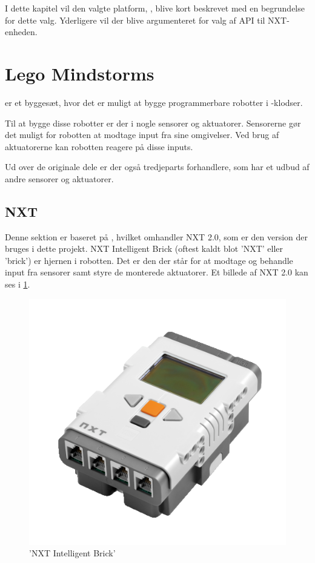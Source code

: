 I dette kapitel vil den valgte platform, \legoms, blive kort beskrevet med en begrundelse for dette valg.
Yderligere vil der blive argumenteret for valg af API til NXT-enheden.

\section{Lego Mindstorms}\label{lego:mindstorms-nxt}
\legoms er et byggesæt, hvor det er muligt at bygge programmerbare robotter i \lego-klodser.

Til at bygge disse robotter er der i \legoms nogle sensorer og aktuatorer. Sensorerne gør det muligt for robotten at modtage input fra sine omgivelser.
Ved brug af aktuatorerne kan robotten reagere på disse inputs.

Ud over de originale \lego dele er der også tredjeparts forhandlere, som har et udbud af andre sensorer og aktuatorer. 

\subsection{NXT}
Denne sektion er baseret på \cite{nxt}, hvilket omhandler NXT 2.0, som er den version der bruges i dette projekt.
NXT Intelligent Brick (oftest kaldt blot 'NXT' eller 'brick') er hjernen i \legoms robotten.
Det er den der står for at modtage og behandle input fra sensorer samt styre de monterede aktuatorer.
Et billede af NXT 2.0 kan ses i \cref{platform:nxt}.

\begin{figure}
\begin{center}
\includegraphics[scale=.5]{./graphics/nxt/brick}
\end{center}
\caption{'NXT Intelligent Brick'}
\label{platform:nxt}
\end{figure}

